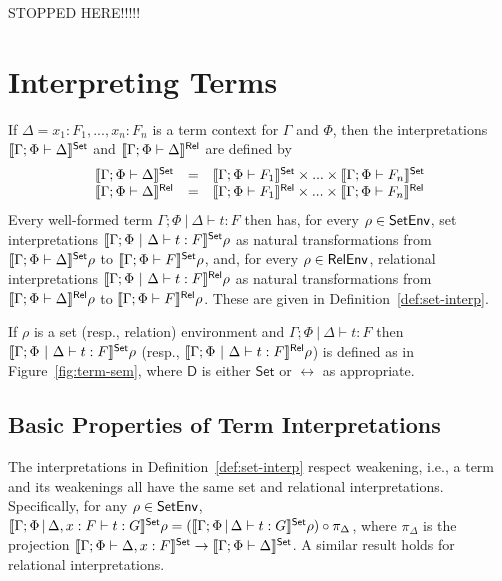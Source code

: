 \documentclass{lmcs}
\theoremstyle{plain}\newtheorem{satz}[thm]{Satz}
\newcommand{\set}{\mathsf{Set}}
\begin{document}
{\color{red} STOPPED HERE!!!!!}

\section{Interpreting Terms}\label{sec:term-interp}

If $\Delta = x_1 : F_1,...,x_n : F_n$ is a term context for $\Gamma$
and $\Phi$, then the interpretations $\setsem{\Gamma;\Phi \vdash \Delta}$ and
$\llbracket{\Gamma;\Phi \vdash \Delta}\rrbracket^{\mathsf{Rel}}$ are defined by
\[\begin{array}{lll}
\setsem{\Gamma;\Phi \vdash \Delta} & = & \setsem{\Gamma;\Phi \vdash
  F_1} \times ... \times \setsem{\Gamma;\Phi \vdash F_n}\\ 
\relsem{\Gamma;\Phi \vdash \Delta} & = & \relsem{\Gamma;\Phi \vdash
  F_1} \times ... \times \relsem{\Gamma;\Phi \vdash F_n}\\ 
\end{array}\]
Every well-formed term $\Gamma;\Phi~|~\Delta \vdash t : F$ then
has, for every $\rho \in \mathsf{SetEnv}$, set interpretations
$\setsem{\Gamma;\Phi~|~\Delta \vdash t : F}\rho$ as natural
transformations from $\setsem{\Gamma; \Phi \vdash \Delta}\rho$ to
$\setsem{\Gamma; \Phi \vdash F}\rho$, and, for every $\rho \in
\mathsf{RelEnv}$, relational interpretations $\llbracket{\Gamma;\Phi~|~\Delta
  \vdash t : F}\rrbracket^{\mathsf{Rel}}\rho$ as natural transformations from
$\llbracket{\Gamma; \Phi \vdash \Delta}\rrbracket^{\mathsf{Rel}}\rho$ to $\llbracket{\Gamma; \Phi
  \vdash F}\rrbracket^{\mathsf{Rel}}\rho$. These are given in Definition~\ref{def:set-interp}.

\begin{defi}\label{def:set-interp}
If $\rho$ is a set (resp., relation) environment and
$\Gamma;\Phi~|~\Delta \vdash t : F$ then
$\setsem{\Gamma;\Phi~|~\Delta \vdash t : F}\rho$ (resp.,
$\llbracket{\Gamma;\Phi~|~\Delta \vdash t : F}\rrbracket^{\mathsf{Rel}}\rho$) is defined as in
Figure~\ref{fig:term-sem}, where $\mathsf D$ is either $\set$ or
$\rel$ as appropriate.
\end{defi}

\subsection{Basic Properties of Term Interpretations}

The interpretations in Definition~\ref{def:set-interp} respect
weakening, i.e., a term and its weakenings all have the same set and
relational interpretations. Specifically, for any $\rho \in \mathsf{SetEnv}$,
$\setsem{\Gamma;\Phi \,|\, \Delta, x : F \vdash t : G}\rho =
(\setsem{\Gamma;\Phi \,|\, \Delta \vdash t : G}\rho) \circ
\pi_{\Delta}$, where $\pi_{\Delta}$ is the projection
$\setsem{\Gamma;\Phi \vdash \Delta, x : F} \to
\setsem{\Gamma;\Phi \vdash \Delta}$. A similar result holds for
relational interpretations.
\end{document}
